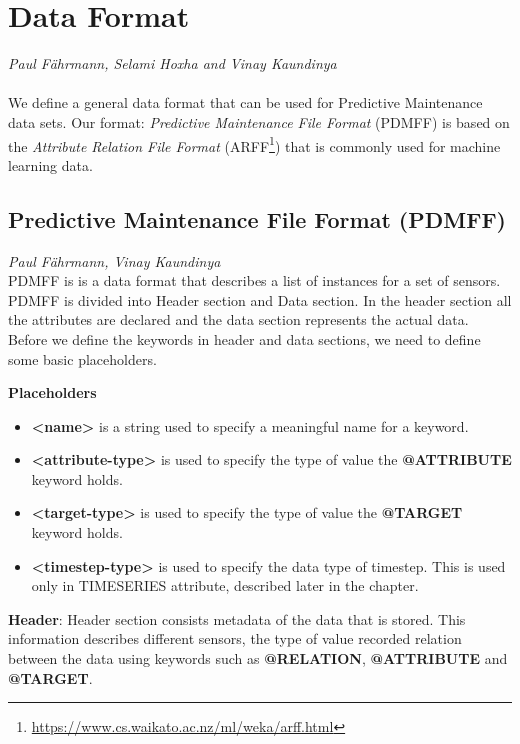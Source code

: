 %
\chapter{Data Format}
\vspace*{-15mm}\hfill{\normalsize\emph{Paul Fährmann, Selami Hoxha and Vinay Kaundinya}}
\label{sec:data_format}
\\\\
We define a general data format that can be used for Predictive Maintenance data sets. Our format: \textit{Predictive Maintenance File Format} (PDMFF) is based on the \textit{Attribute Relation File Format} (ARFF\footnote{\href{https://www.cs.waikato.ac.nz/ml/weka/arff.html}{https://www.cs.waikato.ac.nz/ml/weka/arff.html}}) that is commonly used for machine learning data.

\section{Predictive Maintenance File Format (PDMFF)}
\vspace*{-5mm}\hfill{\normalsize\emph{Paul Fährmann, Vinay Kaundinya}}
\vspace*{+5mm}
\\

PDMFF is is a data format that describes a list of instances for a set of sensors. PDMFF is divided into Header section and Data section. In the header section all the attributes are declared and the data section represents the actual data.
Before we define the keywords in header and data sections, we need to define some basic placeholders.

\textbf{Placeholders}
\begin{itemize}
    \item \textbf{<name>} is a string used to specify a meaningful name for a keyword.
    \item \textbf{<attribute-type>} is used to specify the type of value the \textbf{@ATTRIBUTE} keyword holds.
    \item \textbf{<target-type>} is used to specify the type of value the \textbf{@TARGET} keyword holds.
    \item \textbf{<timestep-type>} is used to specify the data type of timestep. This is used only in TIMESERIES attribute, described later in the chapter.
\end{itemize}

\textbf{Header}: Header section consists metadata of the data that is stored. This information describes different sensors, the type of value recorded relation between the data using keywords such as \textbf{@RELATION}, \textbf{@ATTRIBUTE} and \textbf{@TARGET}.

